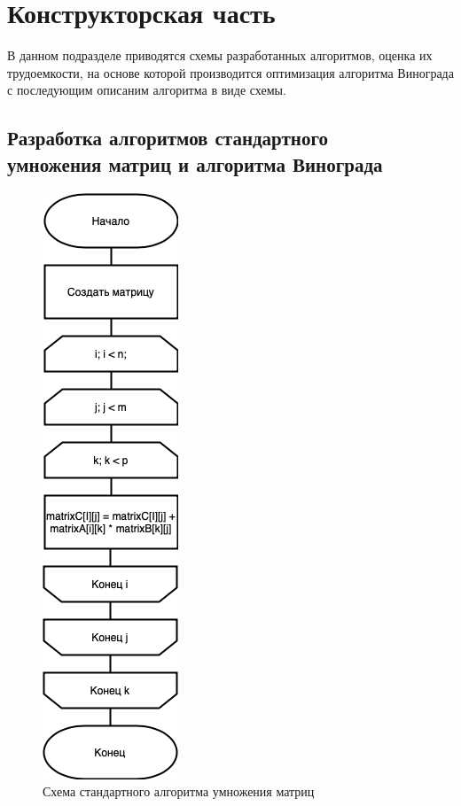 \chapter{Конструкторская часть}

В данном подразделе приводятся схемы разработанных алгоритмов, оценка их
трудоемкости, на основе которой производится оптимизация алгоритма Винограда с
последующим описаним алгоритма в виде схемы.

\section{Разработка алгоритмов стандартного \\
    умножения матриц и алгоритма Винограда}

\begin{figure}[h]
    \centering
    \includegraphics[width=0.21\linewidth]{img/standartAlg.jpg}
    \caption{Схема стандартного алгоритма умножения матриц}
    \label{fig:mpr}
\end{figure}

